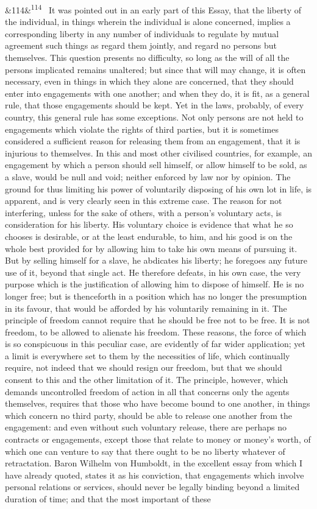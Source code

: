 \documentclass[12pt]{article}
\newcommand{\para}[1][]{\par\noindent\ifx&#1&\else\textsuperscript{\footnotesize #1}~\fi}
\begin{document}
\para[114] It was pointed out in an early part of this Essay, that the liberty of the individual, in things wherein the individual is alone concerned, implies a corresponding liberty in any number of individuals to regulate by mutual agreement such things as regard them jointly, and regard no persons but themselves. This question presents no difficulty, so long as the will of all the persons implicated remains unaltered; but since that will may change, it is often necessary, even in things in which they alone are concerned, that they should enter into engagements with one another; and when they do, it is fit, as a general rule, that those engagements should be kept. Yet in the laws, probably, of every country, this general rule has some exceptions. Not only persons are not held to engagements which violate the rights of third parties, but it is sometimes considered a sufficient reason for releasing them from an engagement, that it is injurious to themselves. In this and most other civilised countries, for example, an engagement by which a person should sell himself, or allow himself to be sold, as a slave, would be null and void; neither enforced by law nor by opinion. The ground for thus limiting his power of voluntarily disposing of his own lot in life, is apparent, and is very clearly seen in this extreme case. The reason for not interfering, unless for the sake of others, with a person's voluntary acts, is consideration for his liberty. His voluntary choice is evidence that what he so chooses is desirable, or at the least endurable, to him, and his good is on the whole best provided for by allowing him to take his own means of pursuing it. But by selling himself for a slave, he abdicates his liberty; he foregoes any future use of it, beyond that single act. He therefore defeats, in his own case, the very purpose which is the justification of allowing him to dispose of himself. He is no longer free; but is thenceforth in a position which has no longer the presumption in its favour, that would be afforded by his voluntarily remaining in it. The principle of freedom cannot require that he should be free not to be free. It is not freedom, to be allowed to alienate his freedom. These reasons, the force of which is so conspicuous in this peculiar case, are evidently of far wider application; yet a limit is everywhere set to them by the necessities of life, which continually require, not indeed that we should resign our freedom, but that we should consent to this and the other limitation of it. The principle, however, which demands uncontrolled freedom of action in all that concerns only the agents themselves, requires that those who have become bound to one another, in things which concern no third party, should be able to release one another from the engagement: and even without such voluntary release, there are perhaps no contracts or engagements, except those that relate to money or money's worth, of which one can venture to say that there ought to be no liberty whatever of retractation. Baron Wilhelm von Humboldt, in the excellent essay from which I have already quoted, states it as his conviction, that engagements which involve personal relations or services, should never be legally binding beyond a limited duration of time; and that the most important of these 
\end{document}
